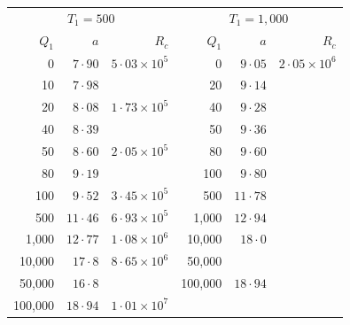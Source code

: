 \begin{table}[p]
\bigskip
\begin{tabular}{r@{\quad}r@{\quad}r|r@{\quad}r@{\quad}r}
\hline
\multicolumn{3}{c|}{$T_1 = 500$} & \multicolumn{3}{c}{$T_1 = 1{,}000$} \\
$Q_1$ & $a$ & $R_c$ & $Q_1$ & $a$ & $R_c$ \\
\hline
 0    & $7{\cdot}90$  & $5{\cdot}03\times10^{5}$ & 0    & $9{\cdot}05$  & $2{\cdot}05\times10^{6}$\\
 10   & $7{\cdot}98$  &                          & 20   & $9{\cdot}14$  &           \\
 20   & $8{\cdot}08$  & $1{\cdot}73\times10^{5}$ & 40   & $9{\cdot}28$  &           \\
 40   & $8{\cdot}39$  &                          & 50   & $9{\cdot}36$  &           \\
 50   & $8{\cdot}60$  & $2{\cdot}05\times10^{5}$ & 80   & $9{\cdot}60$  &           \\
 80   & $9{\cdot}19$  &                          & 100  & $9{\cdot}80$  &           \\
 100  & $9{\cdot}52$  & $3{\cdot}45\times10^{5}$ & 500  & $11{\cdot}78$ &           \\
 500  & $11{\cdot}46$ & $6{\cdot}93\times10^{5}$ & 1{,}000 & $12{\cdot}94$ &        \\
 1{,}000 & $12{\cdot}77$ & $1{\cdot}08\times10^{6}$& 10{,}000 & $18{\cdot}0$ &      \\
 10{,}000 & $17{\cdot}8$ & $8{\cdot}65\times10^{6}$& 50{,}000 &             &       \\
 50{,}000 & $16{\cdot}8$ &                        & 100{,}000 & $18{\cdot}94$ &      \\
 100{,}000 & $18{\cdot}94$ & $1{\cdot}01\times10^{7}$ & & & \\
\hline
\end{tabular}


\end{table}
